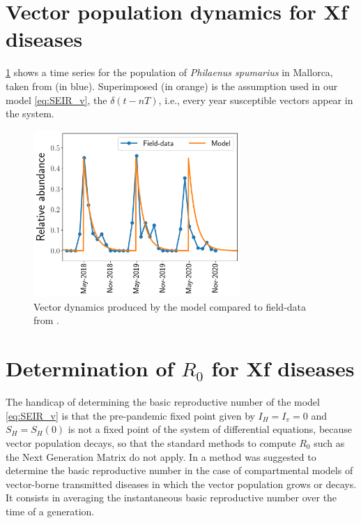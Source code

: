 \section{Vector population dynamics for Xf diseases}\label{app:vector_dynamics}

\cref{fig:vector_dynamics} shows a time series for the population of
\textit{Philaenus spumarius} in Mallorca, taken from \cite{Lopez2021} (in
blue). Superimposed (in orange) is the assumption used in our model
\cref{eq:SEIR_v}, the $\delta(t-nT)$, i.e., every year susceptible vectors
appear in the system.

\begin{figure}
    \centering
    \includegraphics[width=0.7\textwidth]{Figures/Vector_dynamics.pdf}
    \caption[Vector dynamics produced by the model compared to
        field-data]{Vector dynamics produced by the model compared to
        field-data
        from \cite{Lopez2021}.}
    \label{fig:vector_dynamics}
\end{figure}

\section{Determination of $R_0$ for Xf diseases}\label{app:R0}

The handicap of determining the basic reproductive number of the model
\cref{eq:SEIR_v} is that the pre-pandemic fixed point given by $I_H=I_v=0$ and
$S_H=S_H(0)$ is not a fixed point of the system of differential equations,
because vector population decays, so that the standard methods to compute $R_0$
such as the Next Generation Matrix \cite{Diekmann2010, GimenezRomero2022_PRE}
do not
apply. In \cite{GimenezRomero2022_PRE} a method was suggested to determine
the basic
reproductive number in the case of compartmental models of vector-borne
transmitted diseases in which the vector population grows or decays. It
consists in averaging the instantaneous basic reproductive number over the time
of a generation.

